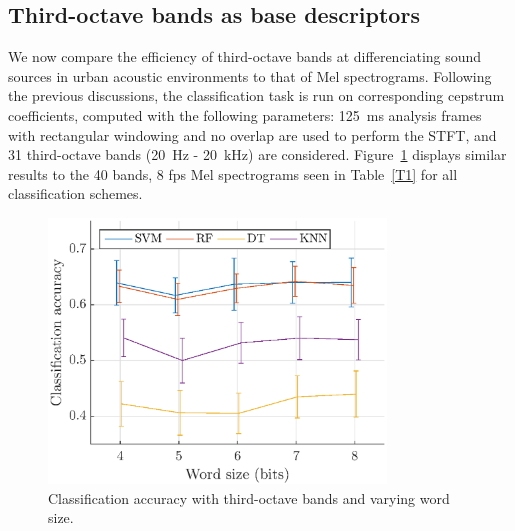 \documentclass[sensors,article,submit,moreauthors,pdftex,10pt,a4paper]{mdpi}
\begin{document}
\subsection{Third-octave bands as base descriptors} \label{sec:tob_r}

We now compare the efficiency of third-octave bands at differenciating sound sources in urban acoustic environments to that of Mel spectrograms. Following the previous discussions, the classification task is run on corresponding cepstrum coefficients, computed with the following parameters: 125~ms analysis frames with rectangular windowing and no overlap are used to perform the STFT, and 31 third-octave bands (20~Hz - 20~kHz) are considered. Figure~\ref{fig:class_tob_q} displays similar results to the 40 bands, 8 fps Mel spectrograms seen in Table~\ref{T1} for all classification schemes.\\

\begin{figure}[htbp]
	\centering
		\includegraphics[width=0.8\textwidth]{figures/class_tob_q.eps}
	\caption{Classification accuracy with third-octave bands and varying word size.}
	\label{fig:class_tob_q}
\end{figure}
\end{document}
